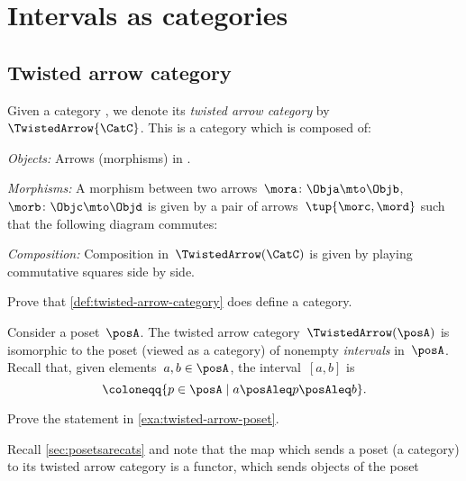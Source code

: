 \section{Intervals as categories}

\subsection{Twisted arrow category}

\begin{ctdefinition}\label{def:twisted-arrow-category}
  \label{def:twisted-arrow}
  Given a category \CatC, we denote its \emph{twisted arrow category} by~$\TwistedArrow{\CatC}$. This is a category which is composed of:
  \begin{compactenum}
    \item \emph{Objects:} Arrows (morphisms) in \CatC.
    \item \emph{Morphisms:} A morphism between two arrows~$\mora\colon \Obja \mto \Objb $,~$\morb\colon \Objc \mto \Objd$ is given by a pair of arrows~$\tup{\morc,\mord}$ such that the following diagram commutes:
    \begin{center}
    \end{center}
    \item \emph{Composition:} Composition in~$\TwistedArrow(\CatC)$ is given by playing commutative squares side by side.
  \end{compactenum}
\end{ctdefinition}

\begin{gradedexercise}\label{ex:TwistedCat}
Prove that \cref{def:twisted-arrow-category} does define a category.
\end{gradedexercise}



\begin{example}[Intervals]
  \label{exa:twisted-arrow-poset}
  Consider a poset~$\posA$.
  The twisted arrow category~$\TwistedArrow(\posA)$ is isomorphic to the poset (viewed as a category) of nonempty \emph{intervals} in~$\posA$.
  Recall that, given elements~$a, b \in \posA$, the interval~$[a,b]$ is
  \begin{equation*}
  [a,b]\coloneqq \{p \in \posA \mid a\posAleq p \posAleq b\}.
  \end{equation*}
\end{example}

\begin{exercise}
Prove the statement in \cref{exa:twisted-arrow-poset}.
\end{exercise}
\begin{solution}
\end{solution}
\begin{remark}
  Recall \cref{sec:posetsarecats} and note that the map which sends a poset (a category) to its twisted arrow category is a functor, which sends objects of the poset
\end{remark}

